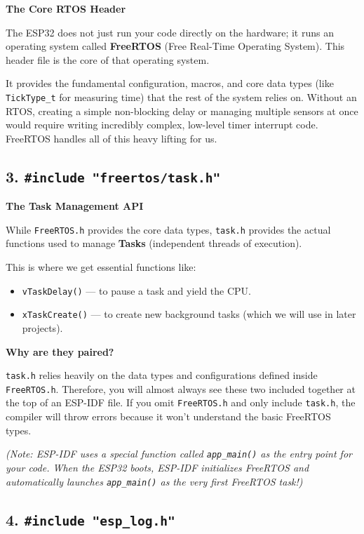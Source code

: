 \documentclass[11pt]{article}
\begin{document}
\textbf{The Core RTOS Header}

The ESP32 does not just run your code directly on the hardware; it runs an operating system called \textbf{FreeRTOS} (Free Real-Time Operating System). This header file is the core of that operating system.

It provides the fundamental configuration, macros, and core data types (like \texttt{TickType\_t} for measuring time) that the rest of the system relies on. Without an RTOS, creating a simple non-blocking delay or managing multiple sensors at once would require writing incredibly complex, low-level timer interrupt code. FreeRTOS handles all of this heavy lifting for us.

\subsection*{3. \texttt{\#include "freertos/task.h"}}

\textbf{The Task Management API}

While \texttt{FreeRTOS.h} provides the core data types, \texttt{task.h} provides the actual functions used to manage \textbf{Tasks} (independent threads of execution).

This is where we get essential functions like:

\begin{itemize}
    \item \texttt{vTaskDelay()} --- to pause a task and yield the CPU.
    
    \item \texttt{xTaskCreate()} --- to create new background tasks (which we will use in later projects).
\end{itemize}

\textbf{Why are they paired?}

\texttt{task.h} relies heavily on the data types and configurations defined inside \texttt{FreeRTOS.h}. Therefore, you will almost always see these two included together at the top of an ESP-IDF file. If you omit \texttt{FreeRTOS.h} and only include \texttt{task.h}, the compiler will throw errors because it won't understand the basic FreeRTOS types.

\emph{(Note: ESP-IDF uses a special function called \texttt{app\_main()} as the entry point for your code. When the ESP32 boots, ESP-IDF initializes FreeRTOS and automatically launches \texttt{app\_main()} as the very first FreeRTOS task!)}

\subsection*{4. \texttt{\#include "esp\_log.h"}}
\end{document}
